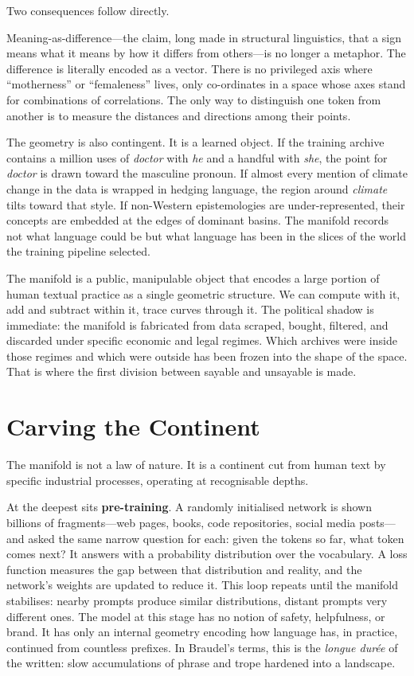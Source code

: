 \documentclass[12pt,a4paper]{article}
\begin{document}
Two consequences follow directly.

Meaning-as-difference---the claim, long made in structural linguistics, that a sign means what it means by how it differs from others---is no longer a metaphor. The difference is literally encoded as a vector. There is no privileged axis where ``motherness'' or ``femaleness'' lives, only co-ordinates in a space whose axes stand for combinations of correlations. The only way to distinguish one token from another is to measure the distances and directions among their points.

The geometry is also contingent. It is a learned object. If the training archive contains a million uses of \emph{doctor} with \emph{he} and a handful with \emph{she}, the point for \emph{doctor} is drawn toward the masculine pronoun. If almost every mention of climate change in the data is wrapped in hedging language, the region around \emph{climate} tilts toward that style. If non-Western epistemologies are under-represented, their concepts are embedded at the edges of dominant basins. The manifold records not what language could be but what language has been in the slices of the world the training pipeline selected.

The manifold is a public, manipulable object that encodes a large portion of human textual practice as a single geometric structure. We can compute with it, add and subtract within it, trace curves through it. The political shadow is immediate: the manifold is fabricated from data scraped, bought, filtered, and discarded under specific economic and legal regimes. Which archives were inside those regimes and which were outside has been frozen into the shape of the space. That is where the first division between sayable and unsayable is made.

\section{Carving the Continent}

The manifold is not a law of nature. It is a continent cut from human text by specific industrial processes, operating at recognisable depths.

At the deepest sits \textbf{pre-training}. A randomly initialised network is shown billions of fragments---web pages, books, code repositories, social media posts---and asked the same narrow question for each: given the tokens so far, what token comes next? It answers with a probability distribution over the vocabulary. A loss function measures the gap between that distribution and reality, and the network's weights are updated to reduce it. This loop repeats until the manifold stabilises: nearby prompts produce similar distributions, distant prompts very different ones. The model at this stage has no notion of safety, helpfulness, or brand. It has only an internal geometry encoding how language has, in practice, continued from countless prefixes. In Braudel's terms, this is the \emph{longue dur\'{e}e} of the written: slow accumulations of phrase and trope hardened into a landscape.
\end{document}

